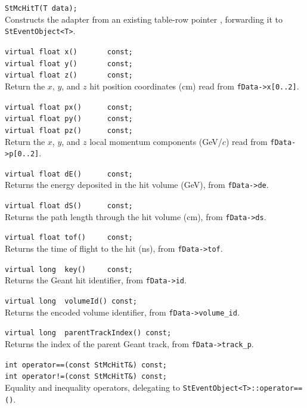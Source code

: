 \begin{Entry}
\item[Public\\ Constructors]
    \verb+StMcHitT(T data);+\\
    Constructs the adapter from an existing table-row pointer ,
    forwarding it to \verb+StEventObject<T>+.

\item[Public Member\\ Functions]
    \verb+virtual float x()       const;+\\
    \verb+virtual float y()       const;+\\
    \verb+virtual float z()       const;+\\
    Return the $x$, $y$, and $z$ hit position coordinates (cm) read from
    \verb+fData->x[0..2]+.

    \verb+virtual float px()      const;+\\
    \verb+virtual float py()      const;+\\
    \verb+virtual float pz()      const;+\\
    Return the $x$, $y$, and $z$ local momentum components (GeV/$c$) read
    from \verb+fData->p[0..2]+.

    \verb+virtual float dE()      const;+\\
    Returns the energy deposited in the hit volume (GeV), from
    \verb+fData->de+.

    \verb+virtual float dS()      const;+\\
    Returns the path length through the hit volume (cm), from
    \verb+fData->ds+.

    \verb+virtual float tof()     const;+\\
    Returns the time of flight to the hit (ns), from \verb+fData->tof+.

    \verb+virtual long  key()     const;+\\
    Returns the Geant hit identifier, from \verb+fData->id+.

    \verb+virtual long  volumeId() const;+\\
    Returns the encoded volume identifier, from \verb+fData->volume_id+.

    \verb+virtual long  parentTrackIndex() const;+\\
    Returns the index of the parent Geant track, from
    \verb+fData->track_p+.

    \verb+int operator==(const StMcHitT&) const;+\\
    \verb+int operator!=(const StMcHitT&) const;+\\
    Equality and inequality operators, delegating to
    \verb+StEventObject<T>::operator==()+.

\end{Entry}

